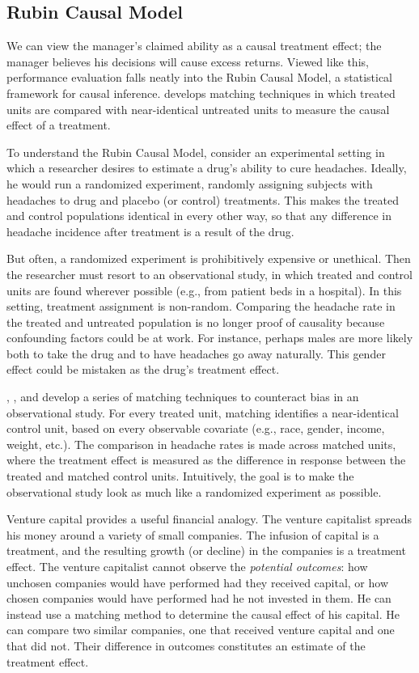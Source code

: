 \documentclass{article}\usepackage{graphicx, color}
\begin{document}
\subsection{Rubin Causal Model \label{SectionRubin}}

We can view the manager's claimed ability as a causal treatment
effect; the manager believes his decisions will cause excess
returns. Viewed like this, performance evaluation falls neatly into the Rubin
Causal Model, a statistical framework for causal
inference. \cite{rubin73.1} develops matching techniques in which
treated units are compared with near-identical untreated units to
measure the causal effect of a treatment.

To understand the Rubin Causal Model, consider an experimental setting
in which a researcher desires to estimate a drug's ability to cure
headaches. Ideally, he would run a randomized experiment, randomly
assigning subjects with headaches to drug and placebo (or control)
treatments. This makes the treated and control populations identical in
every other way, so that any difference in headache incidence after
treatment is a result of the drug.

But often, a randomized experiment is prohibitively expensive or unethical. Then
the researcher must resort to an observational study, in which treated
and control units are found wherever possible (e.g., from patient beds
in a hospital). In this setting, treatment assignment is
non-random. Comparing the headache rate in the treated and untreated
population is no longer proof of causality because confounding factors
could be at work. For instance, perhaps males are more likely both to
take the drug and to have headaches go away naturally. This gender
effect could be mistaken as the drug's treatment effect.

\cite{rubin73.1}, \cite{rubin73.2}, \cite{rubin74} and
\cite{rosenbaum83} develop a series of matching techniques to
counteract bias in an observational study. For every treated unit,
matching identifies a near-identical control unit, based on every
observable covariate (e.g., race, gender, income, weight, etc.). The
comparison in headache rates is made across matched units, where the
treatment effect is measured as the difference in response between
the treated and matched control units. Intuitively, the goal is to
make the observational study look as much like a randomized experiment
as possible.

Venture capital provides a useful financial analogy. The venture
capitalist spreads his money around a variety of small companies. The
infusion of capital is a treatment, and the resulting
growth (or decline) in the companies is a treatment effect. The
venture capitalist cannot observe the \emph{potential outcomes}: how
unchosen companies would have performed had they received capital, or
how chosen companies would have performed had he not invested in
them. He can instead use a matching method to determine the causal
effect of his capital. He can compare two similar companies, one that
received venture capital and one that did not. Their difference in
outcomes constitutes an estimate of the treatment effect.
\end{document}
